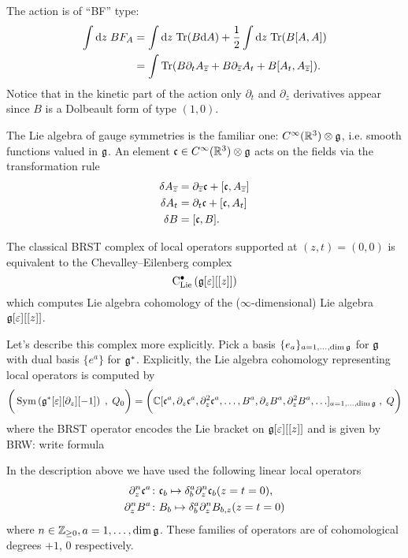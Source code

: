 \documentclass[11pt]{amsart}
\def\ep{\varepsilon}
\def\zbar{{\overline{z}}}
\def\brian#1{{\textcolor{blue!65!red}{BRW: {#1}}}}
\begin{document}
The action is of ``BF'' type:
\begin{align*}
\int \d z \; B F_A & = \int \d z \; \Tr(B \d A) +  \frac12 \int \d z \; \Tr(B [A,A]) \\
& = \int \Tr(B \partial_t A_{\zbar} + B \partial_{\zbar} A_t + B [A_t, A_\zbar]) .
\end{align*}
Notice that in the kinetic part of the action only $\partial_t$ and $\partial_{\zbar}$ derivatives appear since $B$ is a Dolbeault form of type $(1,0)$. 

The Lie algebra of gauge symmetries is the familiar one: $C^\infty(\mathbb R^3) \otimes \mathfrak g$, i.e. smooth functions valued in $\mathfrak g$. 
An element $\mathfrak c \in C^\infty(\mathbb R^3) \otimes \mathfrak g$ acts on the fields via the transformation rule
\begin{align*}
\delta A_\zbar & = \partial_{\zbar} \fc + [\fc, A_\zbar] \\
\delta A_t & = \partial_t \fc + [\fc,A_t] \\
\delta B & = [\fc, B] .
\end{align*}

The classical BRST complex of local operators supported at $(z,t) = (0,0)$ is equivalent to the Chevalley--Eilenberg complex
\[
\clie^\bu \left(\fg[\ep][[z]]\right)
\] 
which computes Lie algebra cohomology of the ($\infty$-dimensional) Lie algebra $\fg[\ep][[z]]$. 


Let's describe this complex more explicitly. 
Pick a basis $\{e_a\}_{a = 1,\ldots, \dim \mathfrak g}$ for $\mathfrak g$ with dual basis $\{e^a\}$ for $\mathfrak g^*$. 
Explicitly, the Lie algebra cohomology representing local operators is computed by 
\[
\bigg(\Sym\left(\fg^*[\ep] [\partial_z] [-1] \right) \; , \; Q_0 \bigg) = \bigg(\CC[\fc^a, \partial_z \fc^a , \partial^2_z \fc^a, \ldots, B^a , \partial_z B^a , \partial_z^2 B^a, \ldots]_{a=1, \ldots, \dim \fg} \; , \; Q \bigg)
\]
where the BRST operator encodes the Lie bracket on $\fg[\ep][[z]]$ and is given by \brian{write formula}

In the description above we have used the following linear local operators
\begin{align*}
\partial_z^n \mathfrak c^a \colon & \mathfrak c_b \mapsto \delta_b^a \partial^n_z \mathfrak c_b (z=t=0), \\
\partial_z^n B^a \colon & B_b \mapsto \delta_b^a \partial_z^n B_{b,z} (z=t=0) 
\end{align*}
where $n \in \mathbb Z_{\geq 0}, a = 1,\ldots, \dim \mathfrak g$. 
These families of operators are of cohomological degrees $+1$, $0$ respectively. 
\end{document}
